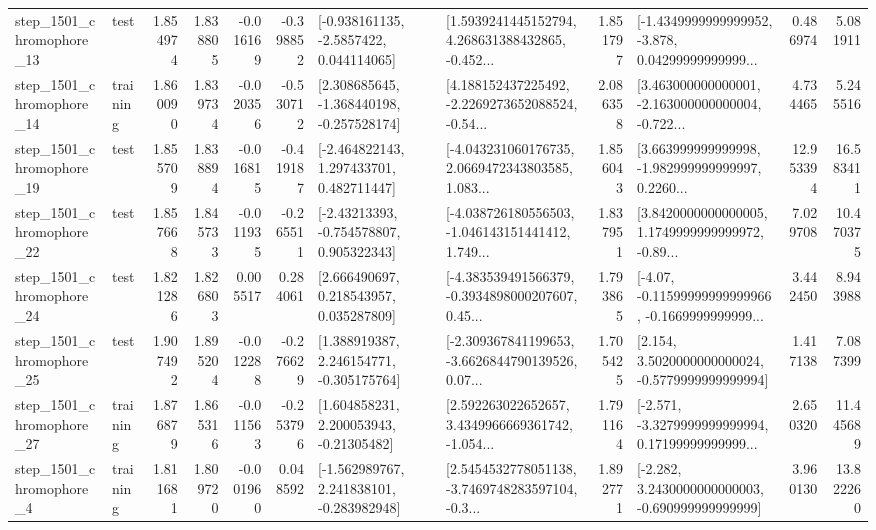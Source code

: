 \begin{tabular}{llrrrrllrlrr}
 step\_1501\_chromophore\_13 &      test &      1.854974 &    1.838805 &     -0.016169 & -0.398852 &     [-0.938161135, -2.5857422, 0.044114065] &  [1.5939241445152794, 4.268631388432865, -0.452... &       1.851797 &  [-1.4349999999999952, -3.878, 0.04299999999999... &            0.486974 &          5.081911 \\
 step\_1501\_chromophore\_14 &  training &      1.860090 &    1.839734 &     -0.020356 & -0.530712 &   [2.308685645, -1.368440198, -0.257528174] &  [4.188152437225492, -2.2269273652088524, -0.54... &       2.086358 &  [3.463000000000001, -2.163000000000004, -0.722... &            4.734465 &          5.245516 \\
 step\_1501\_chromophore\_19 &      test &      1.855709 &    1.838894 &     -0.016815 & -0.419187 &    [-2.464822143, 1.297433701, 0.482711447] &  [-4.043231060176735, 2.0669472343803585, 1.083... &       1.856043 &  [3.663999999999998, -1.982999999999997, 0.2260... &           12.953394 &         16.583411 \\
 step\_1501\_chromophore\_22 &      test &      1.857668 &    1.845733 &     -0.011935 & -0.265511 &    [-2.43213393, -0.754578807, 0.905322343] &  [-4.038726180556503, -1.046143151441412, 1.749... &       1.837951 &  [3.8420000000000005, 1.1749999999999972, -0.89... &            7.029708 &         10.470375 \\
 step\_1501\_chromophore\_24 &      test &      1.821286 &    1.826803 &      0.005517 &  0.284061 &     [2.666490697, 0.218543957, 0.035287809] &  [-4.383539491566379, -0.3934898000207607, 0.45... &       1.793865 &  [-4.07, -0.11599999999999966, -0.1669999999999... &            3.442450 &          8.943988 \\
 step\_1501\_chromophore\_25 &      test &      1.907492 &    1.895204 &     -0.012288 & -0.276629 &    [1.388919387, 2.246154771, -0.305175764] &  [-2.309367841199653, -3.6626844790139526, 0.07... &       1.705425 &   [2.154, 3.5020000000000024, -0.5779999999999994] &            1.417138 &          7.087399 \\
 step\_1501\_chromophore\_27 &  training &      1.876879 &    1.865316 &     -0.011563 & -0.253796 &     [1.604858231, 2.200053943, -0.21305482] &  [2.592263022652657, 3.4349966669361742, -1.054... &       1.791164 &  [-2.571, -3.3279999999999994, 0.17199999999999... &            2.650320 &         11.445689 \\
  step\_1501\_chromophore\_4 &  training &      1.811681 &    1.809720 &     -0.001960 &  0.048592 &   [-1.562989767, 2.241838101, -0.283982948] &  [2.5454532778051138, -3.7469748283597104, -0.3... &       1.892771 &   [-2.282, 3.2430000000000003, -0.690999999999999] &            3.960130 &         13.822260 \\

\end{tabular}
